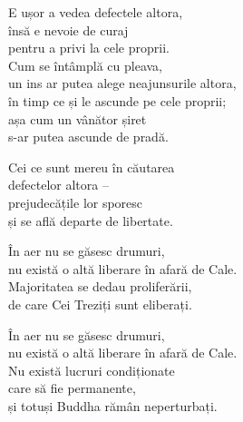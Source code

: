 E ușor a vedea defectele altora,\\
însă e nevoie de curaj\\
pentru a privi la cele proprii.\\
Cum se întâmplă cu pleava,\\
un ins ar putea alege neajunsurile altora,\\
în timp ce și le ascunde pe cele proprii;\\
așa cum un vânător șiret\\
s-ar putea ascunde de pradă.


Cei ce sunt mereu în căutarea\\
defectelor altora –\\
prejudecățile lor sporesc\\
și se află departe de libertate.


În aer nu se găsesc drumuri,\\
nu există o altă liberare în afară de Cale.\\
Majoritatea se dedau proliferării,\\
de care Cei Treziți sunt eliberați.


În aer nu se găsesc drumuri,\\
nu există o altă liberare în afară de Cale.\\
Nu există lucruri condiționate\\
care să fie permanente,\\
și totuși Buddha rămân neperturbați.

